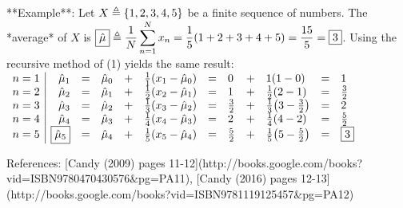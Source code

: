 **Example**:
Let $X \triangleq \left\{1,2,3,4,5\right\}$ be a finite sequence of numbers.
The *average* of $X$ is $\displaystyle
  \boxed{\hat{\mu}} \triangleq \frac{1}{N}\sum_{n=1}^N x_n
                   =    \frac{1}{5}{\left(1+2+3+4+5\right)}
                   =    \frac{15}{5}
                   =    \boxed{3}
$.  
Using the recursive method of (1) yields the same result:
$\begin{array}{l|rclcl clcl cl}
  n=1 & \hat{\mu}_1 &=& \hat{\mu}_0   &+& \frac{1}{1}{\left( x_1 - \hat{\mu}_0 \right)}
                   &=& 0            &+&          1 {\left( 1      - 0          \right)}
                   &=& 1\\
  n=2 & \hat{\mu}_2 &=& \hat{\mu}_1   &+& \frac{1}{2}{\left( x_2 - \hat{\mu}_1 \right)}
                   &=& 1            &+& \frac{1}{2}{\left( 2      - 1          \right)}
                   &=& \frac{3}{2} \\
  n=3 & \hat{\mu}_3 &=& \hat{\mu}_2   &+& \frac{1}{3}{\left( x_3 - \hat{\mu}_2 \right)}
                   &=& \frac{3}{2}  &+& \frac{1}{3}{\left( 3      - \frac{3}{2}\right)}
                   &=& 2           \\
  n=4 & \hat{\mu}_4 &=& \hat{\mu}_3   &+& \frac{1}{4}{\left( x_4 - \hat{\mu}_3 \right)}
                   &=& 2            &+& \frac{1}{4}{\left( 4      - 2          \right)}
                   &=& \frac{5}{2} \\
  n=5 & \boxed{\hat{\mu}_5} &=& \hat{\mu}_4   &+& \frac{1}{5}{\left( x_5 - \hat{\mu}_4 \right)}
                   &=& \frac{5}{2}  &+& \frac{1}{5}{\left( 5      - \frac{5}{2}\right)}
                   &=& \boxed{3}
\end{array}$


References: 
[Candy (2009) pages 11-12](http://books.google.com/books?vid=ISBN9780470430576&pg=PA11),
[Candy (2016) pages 12-13](http://books.google.com/books?vid=ISBN9781119125457&pg=PA12)

